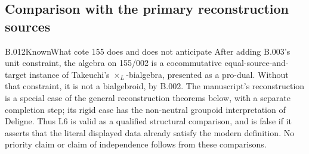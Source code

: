 \subsection{Comparison with the primary reconstruction sources}
\begin{saresult}{B.012}{Known}{What cote 155 does and does not anticipate}
After adding B.003's unit constraint, the algebra on 155/002 is a
cocommutative equal-source-and-target instance of Takeuchi's
$\times_L$-bialgebra, presented as a pro-dual. Without that constraint,
it is not a bialgebroid, by B.002. The manuscript's reconstruction is a
special case of the general reconstruction theorems below, with a
separate completion step; its rigid case has the non-neutral groupoid
interpretation of Deligne. Thus L6 is valid as a qualified structural
comparison, and is false if it asserts that the literal displayed data
already satisfy the modern definition. No priority claim or claim of
independence follows from these comparisons.
\end{saresult}
